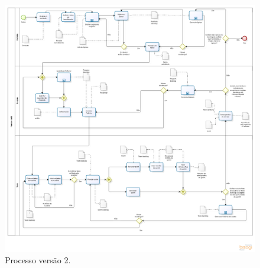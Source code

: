 \begin{anexosenv}
 \begin{figure}[!htbp]
    \centering
    \includegraphics[scale=0.35]{figuras/Processo_v1-2}
    \caption[Big picture do processo.]{Processo versão 2. \footnotemark}
    \label{processo}
  \end{figure}

\end{anexosenv}

